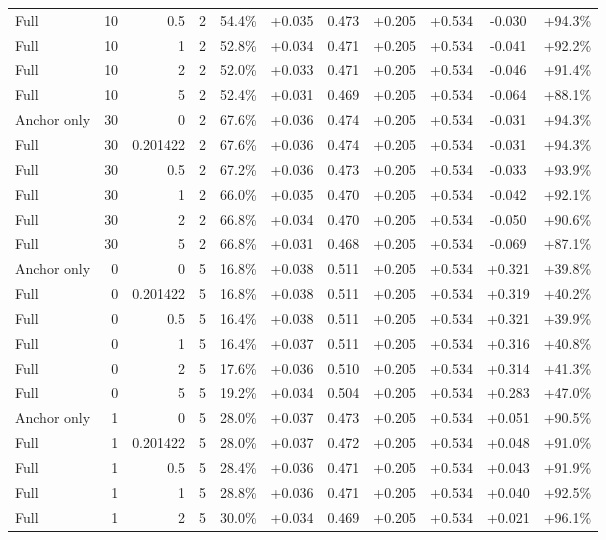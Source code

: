 \begin{table}[htbp]
\begin{tabular}{lrrrccccccc}
Full & 10 & 0.5 & 2 & 54.4\% & +0.035 & 0.473 & +0.205 & +0.534 & -0.030 & +94.3\% \\
Full & 10 & 1 & 2 & 52.8\% & +0.034 & 0.471 & +0.205 & +0.534 & -0.041 & +92.2\% \\
Full & 10 & 2 & 2 & 52.0\% & +0.033 & 0.471 & +0.205 & +0.534 & -0.046 & +91.4\% \\
Full & 10 & 5 & 2 & 52.4\% & +0.031 & 0.469 & +0.205 & +0.534 & -0.064 & +88.1\% \\
Anchor only & 30 & 0 & 2 & 67.6\% & +0.036 & 0.474 & +0.205 & +0.534 & -0.031 & +94.3\% \\
Full & 30 & 0.201422 & 2 & 67.6\% & +0.036 & 0.474 & +0.205 & +0.534 & -0.031 & +94.3\% \\
Full & 30 & 0.5 & 2 & 67.2\% & +0.036 & 0.473 & +0.205 & +0.534 & -0.033 & +93.9\% \\
Full & 30 & 1 & 2 & 66.0\% & +0.035 & 0.470 & +0.205 & +0.534 & -0.042 & +92.1\% \\
Full & 30 & 2 & 2 & 66.8\% & +0.034 & 0.470 & +0.205 & +0.534 & -0.050 & +90.6\% \\
Full & 30 & 5 & 2 & 66.8\% & +0.031 & 0.468 & +0.205 & +0.534 & -0.069 & +87.1\% \\
Anchor only & 0 & 0 & 5 & 16.8\% & +0.038 & 0.511 & +0.205 & +0.534 & +0.321 & +39.8\% \\
Full & 0 & 0.201422 & 5 & 16.8\% & +0.038 & 0.511 & +0.205 & +0.534 & +0.319 & +40.2\% \\
Full & 0 & 0.5 & 5 & 16.4\% & +0.038 & 0.511 & +0.205 & +0.534 & +0.321 & +39.9\% \\
Full & 0 & 1 & 5 & 16.4\% & +0.037 & 0.511 & +0.205 & +0.534 & +0.316 & +40.8\% \\
Full & 0 & 2 & 5 & 17.6\% & +0.036 & 0.510 & +0.205 & +0.534 & +0.314 & +41.3\% \\
Full & 0 & 5 & 5 & 19.2\% & +0.034 & 0.504 & +0.205 & +0.534 & +0.283 & +47.0\% \\
Anchor only & 1 & 0 & 5 & 28.0\% & +0.037 & 0.473 & +0.205 & +0.534 & +0.051 & +90.5\% \\
Full & 1 & 0.201422 & 5 & 28.0\% & +0.037 & 0.472 & +0.205 & +0.534 & +0.048 & +91.0\% \\
Full & 1 & 0.5 & 5 & 28.4\% & +0.036 & 0.471 & +0.205 & +0.534 & +0.043 & +91.9\% \\
Full & 1 & 1 & 5 & 28.8\% & +0.036 & 0.471 & +0.205 & +0.534 & +0.040 & +92.5\% \\
Full & 1 & 2 & 5 & 30.0\% & +0.034 & 0.469 & +0.205 & +0.534 & +0.021 & +96.1\% \\

\end{tabular}
\end{table}
